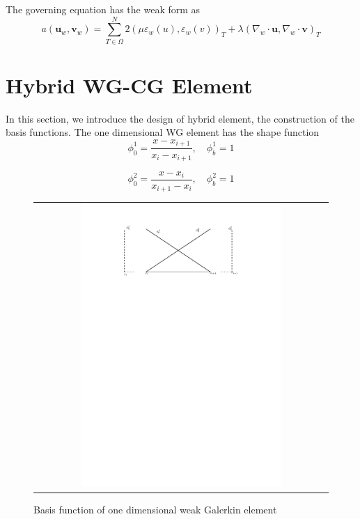 The governing equation has the weak form as
\begin{equation}
a(\mathbf{u}_{w}, \mathbf{v}_{w}) = \sum_{T \in \Omega}^{N} 2(\mu \varepsilon_w (u), \varepsilon_{w} (v))_{T} + \lambda(\nabla_{w} \cdot \mathbf{u}, \nabla_{w} \cdot \mathbf{v})_{T}
\end{equation}

\section{Hybrid WG-CG Element}

In this section, we introduce the design of hybrid element, the construction of the basis functions. The one dimensional WG element has the shape function
\begin{equation}
\phi_{0}^{1} = \frac{x - x_{i +1}}{x_{i} - x_{i +1}}, \quad \phi_{b}^{1} = 1
\end{equation}

\begin{equation}
\phi_{0}^{2} = \frac{x - x_{i}}{x_{i + 1} - x_{i}}, \quad \phi_{b}^{2} = 1
\end{equation}

\begin{figure}[h]
	\centering
	\begin{tabular}{c}
		\includegraphics[width=0.7\textwidth]{./pics/oneD}
	\end{tabular}
	\caption{\footnotesize Basis function of one dimensional weak Galerkin element}
\end{figure}

